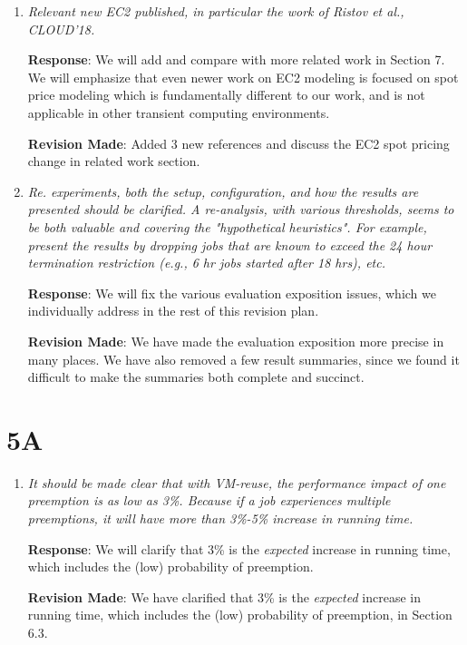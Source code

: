 \documentclass{article}
\newcommand{\resp}[1]{\textbf{Response}: #1}
\newcommand{\revmade}[1]{\textbf{Revision Made}: #1}
\begin{document}
\begin{enumerate}

\item \emph{Relevant new EC2 published, in particular the work of Ristov et al., CLOUD'18.}

\resp{We will add and compare with more related work in Section 7. We will emphasize that even newer work on EC2 modeling is focused on spot price modeling which is fundamentally different to our work, and is not applicable in other transient computing environments.}

\revmade{Added 3 new references and discuss the EC2 spot pricing change in related work section.}

\item \emph{Re. experiments, both the setup, configuration, and how the results are presented should be clarified. A re-analysis, with various thresholds, seems to be both valuable and covering the "hypothetical heuristics". For example, present the results by dropping jobs that are known to exceed the 24 hour termination restriction (e.g., 6 hr jobs started after 18 hrs), etc.}

\resp{We will fix the various evaluation exposition issues, which we individually address in the rest of this revision plan.}

\revmade{We have made the evaluation exposition more precise in many places. We have also removed a few result summaries, since we found it difficult to make the summaries both complete and succinct.} 


\end{enumerate}


\section{5A}

\begin{enumerate}

\item \emph{It should be made clear that with VM-reuse, the performance impact of one preemption is as low as 3\%. Because if a job experiences multiple preemptions, it will have more than 3\%-5\% increase in running time.}

\resp{We will clarify that 3\% is the \emph{expected} increase in running time, which includes the (low) probability of preemption.  }

\revmade{We have clarified that 3\% is the \emph{expected} increase in running time, which includes the (low) probability of preemption, in Section 6.3. }

\end{enumerate}
\end{document}

